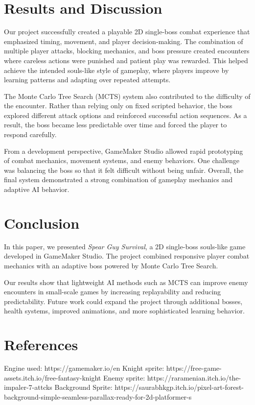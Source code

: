 \documentclass{article}
\begin{document}
\section{Results and Discussion}

Our project successfully created a playable 2D single-boss combat experience that emphasized timing, movement, and player decision-making. The combination of multiple player attacks, blocking mechanics, and boss pressure created encounters where careless actions were punished and patient play was rewarded. This helped achieve the intended souls-like style of gameplay, where players improve by learning patterns and adapting over repeated attempts.

The Monte Carlo Tree Search (MCTS) system also contributed to the difficulty of the encounter. Rather than relying only on fixed scripted behavior, the boss explored different attack options and reinforced successful action sequences. As a result, the boss became less predictable over time and forced the player to respond carefully.

From a development perspective, GameMaker Studio allowed rapid prototyping of combat mechanics, movement systems, and enemy behaviors. One challenge was balancing the boss so that it felt difficult without being unfair. Overall, the final system demonstrated a strong combination of gameplay mechanics and adaptive AI behavior.

\section{Conclusion}

In this paper, we presented \textit{Spear Guy Survival}, a 2D single-boss souls-like game developed in GameMaker Studio. The project combined responsive player combat mechanics with an adaptive boss powered by Monte Carlo Tree Search.

Our results show that lightweight AI methods such as MCTS can improve enemy encounters in small-scale games by increasing replayability and reducing predictability. Future work could expand the project through additional bosses, health systems, improved animations, and more sophisticated learning behavior.

\section*{References}

{
\small
Engine used: https://gamemaker.io/en \newline
Knight sprite: https://free-game-assets.itch.io/free-fantasy-knight \newline
Enemy sprite: https://raramenian.itch.io/the-impaler-7-attcks \newline
Background Sprite: https://saurabhkgp.itch.io/pixel-art-forest-background-simple-seamless-parallax-ready-for-2d-platformer-s




}
\end{document}
